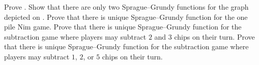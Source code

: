 \begin{chapterendexercises}
    \exercise Prove .
    \exercise Show that there are only two Sprague--Grundy functions for the
      graph depicted on .
    \exercise Prove that there is unique Sprague--Grundy function for the one pile
        Nim game.
    \exercise Prove that there is unique Sprague--Grundy function for the
        subtraction game where players may subtract $2$ and $3$ chips on their
        turn.
    \exercise
       Prove that there is unique Sprague--Grundy function for the subtraction
       game where players may subtract $1$, $2$, or $5$ chips
       on their turn.
\end{chapterendexercises}
